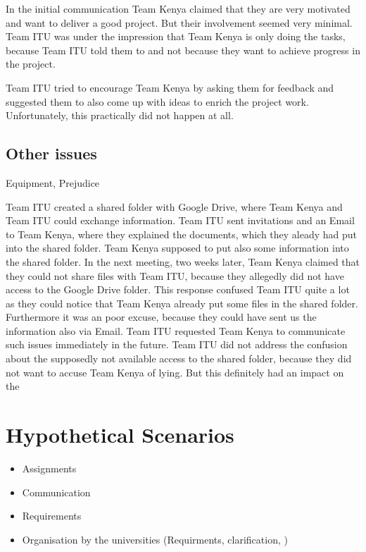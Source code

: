 In the initial communication Team Kenya claimed that they are very motivated and want to deliver a good project. But their involvement seemed very minimal. Team ITU was under the impression that Team Kenya is only doing the tasks, because Team ITU told them to and not because they want to achieve progress in the project.

Team ITU tried to encourage Team Kenya by asking them for feedback and suggested them to also come up with ideas to enrich the project work. Unfortunately, this practically did not happen at all.


\subsection{Other issues}
Equipment, Prejudice

Team ITU created a shared folder with Google Drive, where Team Kenya and Team ITU could exchange information. Team ITU sent invitations and an Email to Team Kenya, where they explained the documents, which they aleady had put into the shared folder. Team Kenya supposed to put also some information into the shared folder. In the next meeting, two weeks later, Team Kenya claimed that they could not share files with Team ITU, because they allegedly did not have access to the Google Drive folder. This response confused Team ITU quite a lot as they could notice that Team Kenya already put some files in the shared folder. Furthermore it was an poor excuse, because they could have sent us the information also via Email.
Team ITU requested Team Kenya to communicate such issues immediately in the future. Team ITU did not address the confusion about the supposedly not available access to the shared folder, because they did not want to accuse Team Kenya of lying. But this definitely had an impact on the


\section{Hypothetical Scenarios}


	\begin{itemize}
		\item Assignments
		\item Communication
		\item Requirements
		\item Organisation by the universities (Requirments, clarification, )
	\end{itemize}
